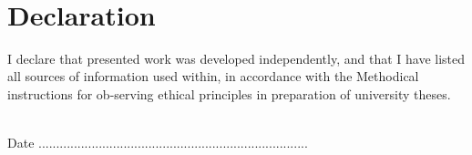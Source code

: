 ~\vfill{}

\section*{Declaration}

I declare that presented work was developed independently, and that I have listed all sources of information used within, in accordance with the Methodical instructions for ob-serving ethical principles in preparation of university theses.

\vspace{1.5cm}
~\\

Date .............................\hfill{}...............................................

\hfill{}~~~~~~~~~~~~~~~

\newpage{}
